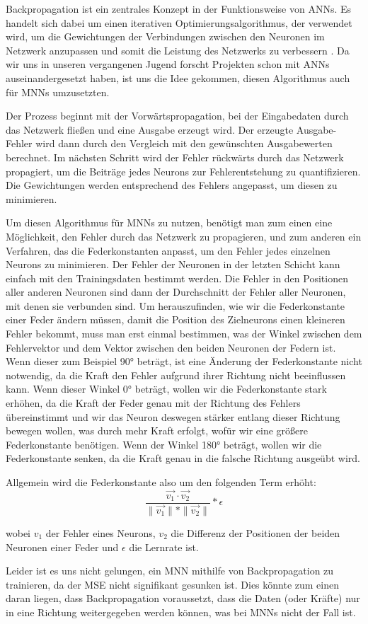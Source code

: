 Backpropagation ist ein zentrales Konzept in der Funktionsweise von ANNs.
Es handelt sich dabei um einen iterativen Optimierungsalgorithmus, der verwendet wird, um die Gewichtungen der Verbindungen zwischen den Neuronen im Netzwerk anzupassen und somit die Leistung des Netzwerks zu verbessern \cite{brotcrunsher:backwardpass}. Da wir uns in unseren vergangenen Jugend forscht Projekten schon mit ANNs auseinandergesetzt haben, ist uns die Idee gekommen, diesen Algorithmus auch für MNNs umzusetzten.

Der Prozess beginnt mit der Vorwärtspropagation, bei der Eingabedaten durch das Netzwerk fließen und eine Ausgabe erzeugt wird. Der erzeugte Ausgabe-Fehler wird dann durch den Vergleich mit den gewünschten Ausgabewerten berechnet. Im nächsten Schritt wird der Fehler rückwärts durch das Netzwerk propagiert, um die Beiträge jedes Neurons zur Fehlerentstehung zu quantifizieren.
Die Gewichtungen werden entsprechend des Fehlers angepasst, um diesen zu minimieren.

Um diesen Algorithmus für MNNs zu nutzen, benötigt man zum einen eine Möglichkeit, den Fehler durch das Netzwerk zu propagieren, und zum anderen ein Verfahren, das die Federkonstanten anpasst, um den Fehler jedes einzelnen Neurons zu minimieren.
Der Fehler der Neuronen in der letzten Schicht kann einfach mit den Trainingsdaten bestimmt werden. Die Fehler in den Positionen aller anderen Neuronen sind dann der Durchschnitt der Fehler aller Neuronen, mit denen sie verbunden sind. Um herauszufinden, wie wir die Federkonstante einer Feder ändern müssen, damit die Position des Zielneurons einen kleineren Fehler bekommt, muss man erst einmal bestimmen, was der Winkel zwischen dem Fehlervektor und dem Vektor zwischen den beiden Neuronen der Federn ist. Wenn dieser zum Beispiel 90° beträgt, ist eine Änderung der Federkonstante nicht notwendig, da die Kraft den Fehler aufgrund ihrer Richtung nicht beeinflussen kann. Wenn dieser Winkel 0° beträgt, wollen wir die Federkonstante stark erhöhen, da die Kraft der Feder genau mit der Richtung des Fehlers übereinstimmt und wir das Neuron deswegen stärker entlang dieser Richtung bewegen wollen, was durch mehr Kraft erfolgt, wofür wir eine größere Federkonstante benötigen. Wenn der Winkel 180° beträgt, wollen wir die Federkonstante senken, da die Kraft genau in die falsche Richtung ausgeübt wird.

Allgemein wird die Federkonstante also um den folgenden Term erhöht:
{\[
    \frac{\vec{v_1} \cdot \vec{v_2}}{\| \vec{v_1} \| * \| \vec{v_2} \|} * \epsilon
\]}

wobei $v_1$ der Fehler eines Neurons, $v_2$ die Differenz der Positionen der beiden Neuronen einer Feder und $\epsilon$ die Lernrate ist.

Leider ist es uns nicht gelungen, ein MNN mithilfe von Backpropagation zu trainieren, da der MSE nicht signifikant gesunken ist.
Dies könnte zum einen daran liegen, dass Backpropagation voraussetzt, dass die Daten (oder Kräfte) nur in eine Richtung weitergegeben werden können, was bei MNNs nicht der Fall ist.